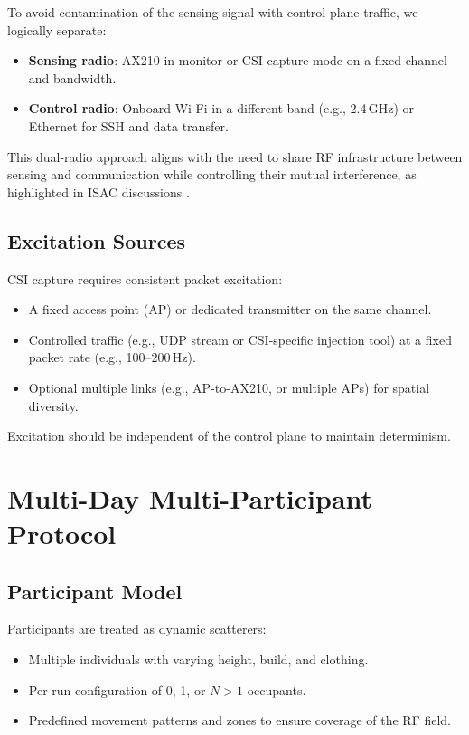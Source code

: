\documentclass[11pt,a4paper]{article}
\begin{document}
To avoid contamination of the sensing signal with control-plane traffic, we logically separate:

\begin{itemize}[leftmargin=*]
\item \textbf{Sensing radio}: AX210 in monitor or CSI capture mode on a fixed channel and bandwidth.
\item \textbf{Control radio}: Onboard Wi-Fi in a different band (e.g., 2.4\,GHz) or Ethernet for SSH and data transfer.
\end{itemize}

This dual-radio approach aligns with the need to share RF infrastructure between sensing and communication while controlling their mutual interference, as highlighted in ISAC discussions \cite{wang2022isac}.

\subsection{Excitation Sources}

CSI capture requires consistent packet excitation:

\begin{itemize}[leftmargin=*]
\item A fixed access point (AP) or dedicated transmitter on the same channel.
\item Controlled traffic (e.g., UDP stream or CSI-specific injection tool) at a fixed packet rate (e.g., 100--200\,Hz).
\item Optional multiple links (e.g., AP-to-AX210, or multiple APs) for spatial diversity.
\end{itemize}

Excitation should be independent of the control plane to maintain determinism.

\section{Multi-Day Multi-Participant Protocol}

\subsection{Participant Model}

Participants are treated as dynamic scatterers:

\begin{itemize}[leftmargin=*]
\item Multiple individuals with varying height, build, and clothing.
\item Per-run configuration of 0, 1, or $N>1$ occupants.
\item Predefined movement patterns and zones to ensure coverage of the RF field.
\end{itemize}
\end{document}
